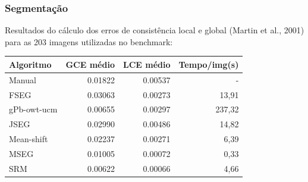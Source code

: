 \documentclass[t]{beamer}
\begin{document}
\begin{frame}[c]
	\frametitle{Segmentação}

	Resultados do cálculo dos erros de consistência local e global (Martin et al., 2001) para as 203 imagens utilizadas no benchmark:

	\small{
	\begin{table}[h]
		\begin{tabulary}{\linewidth}{|L|R|R|R|}
		\hline
			\textbf{Algoritmo} & \textbf{GCE médio} & \textbf{LCE médio} & \textbf{Tempo/img(s)} \\ \hline
			Manual      & 0.01822          & 0.00537         & - \\ \hline
			FSEG        & 0.03063          & 0.00273         & 13,91 \\ \hline
			gPb-owt-ucm & 0.00655          & 0.00297         & 237,32 \\ \hline
			JSEG        & 0.02990          & 0.00486         & 14,82 \\ \hline
			Mean-shift  & 0.02237          & 0.00271         & 6,39 \\ \hline
			MSEG        & 0.01005          & 0.00072         &  0,33 \\ \hline
			SRM         &  0.00622 &  0.00066 & 4,66 \\ \hline
		\end{tabulary}
	\end{table}
	}
\end{frame}

%
%
%
\end{document}
